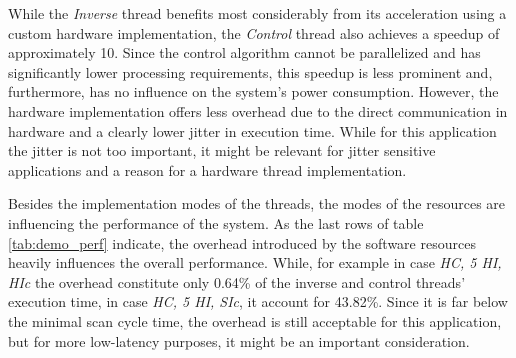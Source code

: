 While the \emph{Inverse} thread benefits most considerably from its
acceleration using a custom hardware implementation, the \emph{Control} thread
also achieves a speedup of approximately 10. Since the control algorithm
cannot be parallelized and has significantly lower processing requirements,
this speedup is less prominent and, furthermore, has no influence on the
system's power consumption. However, the hardware implementation offers less
overhead due to the direct communication in hardware and a clearly lower
jitter in execution time. While for this application the jitter is not too
important, it might be relevant for jitter sensitive applications and a reason
for a hardware thread implementation.

Besides the implementation modes of the threads, the modes of the resources
are influencing the performance of the system. As the last rows of table
\ref{tab:demo_perf} indicate, the overhead introduced by the software
resources heavily influences the overall performance. While, for example in
case \emph{HC, 5 HI, HIc} the overhead constitute only 0.64\% of the inverse
and control threads' execution time, in case \emph{HC, 5 HI, SIc}, it account
for 43.82\%. Since it is far below the minimal scan cycle time, the overhead
is still acceptable for this application, but for more low-latency purposes,
it might be an important consideration.


